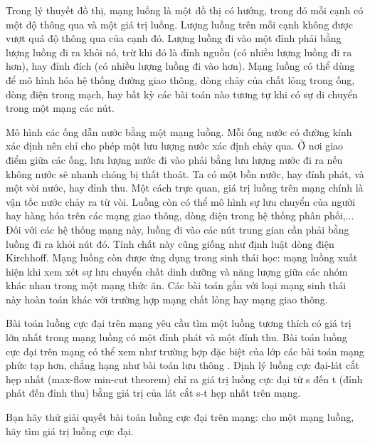 Trong lý thuyết đồ thị,   mạng luồng   là một đồ thị có hướng, trong đó mỗi cạnh có một độ thông qua và một giá trị luồng. Lượng luồng trên mỗi cạnh không được vượt quá độ thông qua của cạnh đó.   Lượng luồng đi vào một đỉnh phải bằng lượng luồng đi ra khỏi nó, trừ khi đó là đỉnh nguồn (có nhiều lượng luồng đi ra hơn), hay đỉnh đích (có nhiều lượng luồng đi vào hơn). Mạng luồng có thể dùng để mô   hình hóa hệ thống đường giao thông, dòng chảy của chất lỏng trong ống, dòng điện trong mạch, hay bất kỳ các bài toán nào tương tự khi có sự di chuyển trong một mạng các nút.  

   Mô hình các ống dẫn nước bằng một mạng luồng. Mỗi ống nước có đường kính xác định nên chỉ cho phép một lưu lượng nước xác định chảy qua. Ở nơi giao điểm giữa các ống, lưu lượng nước đi vào   phải bằng lưu lượng nước đi ra nếu không nước sẽ nhanh chóng bị thất thoát. Ta có một bồn nước, hay đỉnh phát, và một vòi nước, hay đỉnh thu. Một cách trực quan, giá trị luồng trên mạng chính là vận tốc   nước chảy ra từ vòi. Luồng còn có thể mô hình sự lưu chuyển của người hay hàng hóa trên các mạng giao thông, dòng điện trong hệ thống phân phối,... Đối với các hệ thống mạng này, luồng đi vào các nút   trung gian cần phải bằng luồng đi ra khỏi nút đó. Tính chất này cũng giống như định luật dòng điện Kirchhoff. Mạng luồng còn được ứng dụng trong sinh thái học: mạng luồng xuất hiện khi xem xét sự lưu   chuyển chất dinh dưỡng và năng lượng giữa các nhóm khác nhau trong một mạng thức ăn. Các bài toán gắn với loại mạng sinh thái này hoàn toán khác với trường hợp mạng chất lỏng hay mạng giao thông.  

   Bài toán   luồng cực đại trên mạng   yêu cầu tìm một luồng tương thích có giá trị lớn nhất trong mạng luồng có một đỉnh phát và một đỉnh thu. Bài toán luồng cực đại trên mạng có thể xem như trường   hợp đặc biệt của lớp các bài toán mạng phức tạp hơn, chẳng hạng như bài toán   lưu thông   . Định lý luồng cực đại-lát cắt hẹp nhất (max-flow min-cut theorem) chỉ ra giá trị luồng cực đại từ s đến t (đỉnh   phát đến đỉnh thu) bằng giá trị của lát cắt s-t hẹp nhất trên mạng.  

   Bạn hãy thử giải quyết bài toán luồng cực đại trên mạng: cho một mạng luồng, hãy tìm giá trị luồng cực đại.